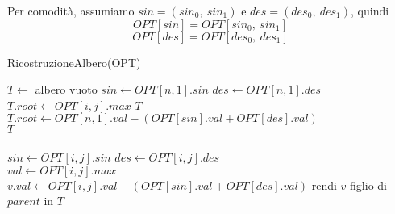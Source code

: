 Per comodità, assumiamo $sin = (sin_{0},\ sin_{1})$ e $des = (des_{0},\ des_{1})$, quindi
$$
OPT[sin] = OPT[sin_{0},\ sin_{1}]
$$
$$
OPT[des] = OPT[des_{0},\ des_{1}]
$$ 

\begin{algorithm}
	\caption{RicostruzioneAlbero(OPT)}
	\begin{algorithmic}[1]
		\State $T \gets$ albero vuoto
		\State $sin \gets OPT[n, 1].sin$
		\State $des \gets OPT[n, 1].des$
		\\
		 
		\State $T.root \gets OPT[i, j].max$
		\State \Return $T$
		\EndIf
		\\
		\State $T.root \gets OPT[n, 1].val - (OPT[sin].val + OPT[des].val)$
		\State {}
		\State {}
		\\
		\State \Return $T$
	\EndFunction
\\
\\
	\State $sin \gets OPT[i, j].sin$
	\State $des \gets OPT[i, j].des$
	\\
	 
	\State $val \gets OPT[i, j].max$
	\State \Return
	\EndIf
	\\
	\State $v.val \gets OPT[i, j].val - (OPT[sin].val + OPT[des].val)$
	\State rendi $v$ figlio di $parent$ in $T$
	\\
	\State {}
	\State {}
	\EndFunction

\end{algorithmic}
\end{algorithm}